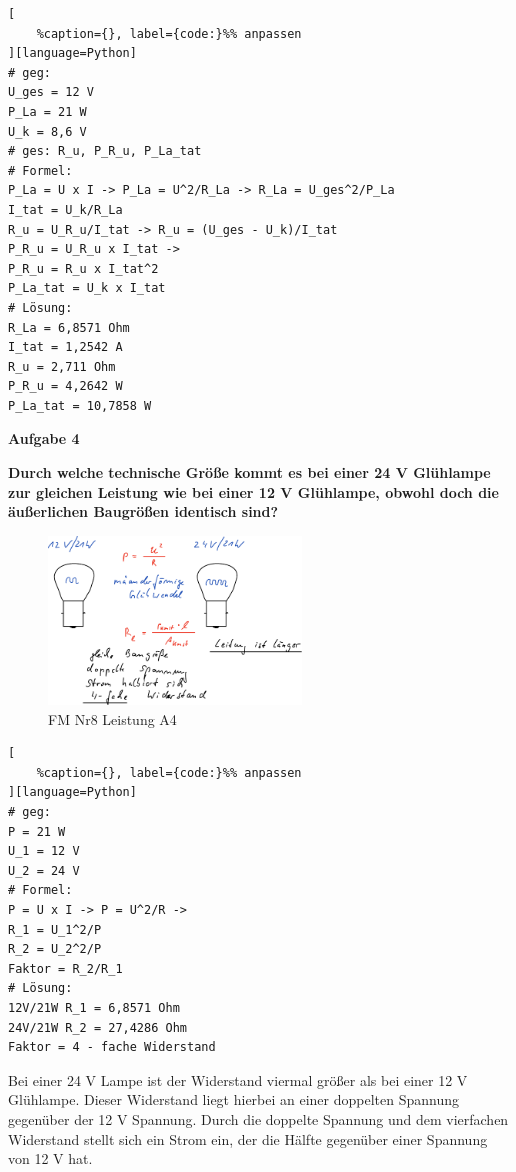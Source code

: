 \lstset{language=Python}%
\begin{lstlisting}[
	%caption={}, label={code:}%% anpassen
][language=Python]
# geg:
U_ges = 12 V
P_La = 21 W
U_k = 8,6 V
# ges: R_u, P_R_u, P_La_tat
# Formel:
P_La = U x I -> P_La = U^2/R_La -> R_La = U_ges^2/P_La
I_tat = U_k/R_La
R_u = U_R_u/I_tat -> R_u = (U_ges - U_k)/I_tat
P_R_u = U_R_u x I_tat ->
P_R_u = R_u x I_tat^2
P_La_tat = U_k x I_tat
# Lösung:
R_La = 6,8571 Ohm
I_tat = 1,2542 A
R_u = 2,711 Ohm
P_R_u = 4,2642 W
P_La_tat = 10,7858 W
\end{lstlisting}

\newpage

\textbf{Aufgabe 4}

\textbf{Durch welche technische Größe kommt es bei einer 24 V Glühlampe
zur gleichen Leistung wie bei einer 12 V Glühlampe, obwohl doch die
äußerlichen Baugrößen identisch sind?}

\begin{figure}[!ht]%
\centering
\includegraphics[width=0.6\textwidth]{images/Skizze/26_FM_Nr8_Leistung_A4.pdf}
\caption{FM Nr8 Leistung A4}
\end{figure}

\lstset{language=Python}%
\begin{lstlisting}[
	%caption={}, label={code:}%% anpassen
][language=Python]
# geg:
P = 21 W
U_1 = 12 V
U_2 = 24 V
# Formel:
P = U x I -> P = U^2/R ->
R_1 = U_1^2/P
R_2 = U_2^2/P
Faktor = R_2/R_1
# Lösung:
12V/21W R_1 = 6,8571 Ohm
24V/21W R_2 = 27,4286 Ohm
Faktor = 4 - fache Widerstand
\end{lstlisting}

Bei einer 24 V Lampe ist der Widerstand viermal größer als bei einer 12
V Glühlampe. Dieser Widerstand liegt hierbei an einer doppelten Spannung
gegenüber der 12 V Spannung. Durch die doppelte Spannung und dem
vierfachen Widerstand stellt sich ein Strom ein, der die Hälfte
gegenüber einer Spannung von 12 V hat.

